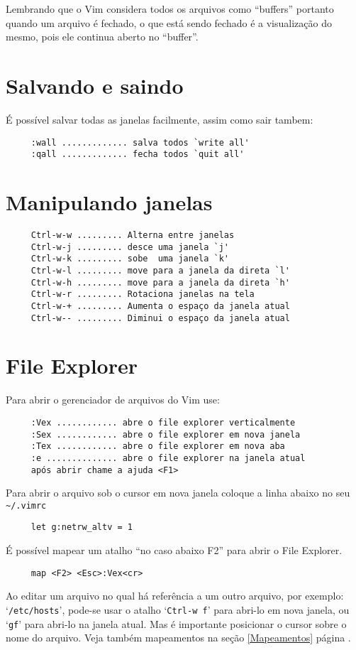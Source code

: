 {\Large {}} Lembrando que o Vim considera todos os arquivos como ``buffers''
portanto quando um arquivo é fechado, o que está sendo fechado é a visualização
do mesmo, pois ele continua aberto no ``buffer''.


\section{Salvando e saindo}
É possível salvar todas as janelas facilmente, assim como sair tambem:

\begin{verbatim}
     :wall ............. salva todos `write all'
     :qall ............. fecha todos `quit all'
\end{verbatim}


\section{Manipulando janelas }

\begin{verbatim}
     Ctrl-w-w ......... Alterna entre janelas
     Ctrl-w-j ......... desce uma janela `j'
     Ctrl-w-k ......... sobe  uma janela `k'
     Ctrl-w-l ......... move para a janela da direta `l'
     Ctrl-w-h ......... move para a janela da direta `h'
     Ctrl-w-r ......... Rotaciona janelas na tela
     Ctrl-w-+ ......... Aumenta o espaço da janela atual
     Ctrl-w-- ......... Diminui o espaço da janela atual
\end{verbatim}

\section{File Explorer }
\label{File Explorer }
Para abrir o gerenciador de arquivos do Vim use:

\begin{verbatim}
     :Vex ............ abre o file explorer verticalmente
     :Sex ............ abre o file explorer em nova janela
     :Tex ............ abre o file explorer em nova aba
     :e .............. abre o file explorer na janela atual
     após abrir chame a ajuda <F1>
\end{verbatim}

Para abrir o arquivo sob o cursor em nova janela coloque a linha abaixo no seu \verb|~/.vimrc|

\begin{verbatim}
     let g:netrw_altv = 1
\end{verbatim}

É possível mapear um atalho ``no caso abaixo F2'' para abrir o File Explorer.

\begin{verbatim}
     map <F2> <Esc>:Vex<cr>
\end{verbatim}


{\Large {}} Ao editar um arquivo no qual há referência a um outro
arquivo, por exemplo: `{\tt /etc/hosts}', pode-se usar o atalho `{\tt Ctrl-w
f}' para abri-lo em nova janela, ou `{\tt gf}' para abri-lo na janela atual.
Mas é importante posicionar o cursor sobre o nome do arquivo.  Veja também
mapeamentos na seção \ref{Mapeamentos} página \pageref{Mapeamentos}.
